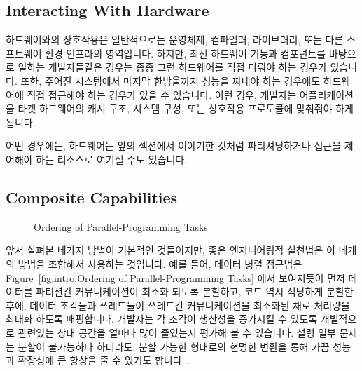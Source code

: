 \subsection{Interacting With Hardware}
\label{sec:Interacting With Hardware}

하드웨어와의 상호작용은 일반적으로는 운영체제, 컴파일러, 라이브러리, 또는 다른
소프트웨어 환경 인프라의 영역입니다.
하지만, 최신 하드웨어 기능과 컴포넌트를 바탕으로 일하는 개발자들같은 경우는
종종 그런 하드웨어를 직접 다뤄야 하는 경우가 있습니다.
또한, 주어진 시스템에서 마지막 한방울까지 성능을 짜내야 하는 경우에도
하드웨어에 직접 접근해야 하는 경우가 있을 수 있습니다.
이런 경우, 개발자는 어플리케이션을 타겟 하드웨어의 캐시 구조, 시스템 구성, 또는
상호작용 프로토콜에 맞춰줘야 하게 됩니다.

어떤 경우에는, 하드웨어는 앞의 섹션에서 이야기한 것처럼 파티셔닝하거나 접근을
제어해야 하는 리소스로 여겨질 수도 있습니다.

\subsection{Composite Capabilities}
\label{sec:Composite Capabilities}

\begin{figure}[tb]
\centering
{}
\caption{Ordering of Parallel-Programming Tasks}
\label{fig:intro:Ordering of Parallel-Programming Tasks}
\end{figure}

앞서 살펴본 네가지 방법이 기본적인 것들이지만, 좋은 엔지니어링적 실천법은 이
네개의 방법을 조합해서 사용하는 것입니다.
예를 들어, 데이터 병렬 접근법은 Figure~\ref{fig:intro:Ordering of
Parallel-Programming Tasks} 에서 보여지듯이 먼저 데이터를 파티션간
커뮤니케이션이 최소화 되도록 분할하고, 코드 역시 적당하게 분할한 후에, 데이터
조각들과 쓰레드들이 쓰레드간 커뮤니케이션을 최소화된 채로 처리량을 최대화
하도록 매핑합니다.
개발자는 각 조각이 생산성을 증가시킬 수 있도록 개별적으로 관련있는 상태 공간을
얼마나 많이 줄였는지 평가해 볼 수 있습니다.
설령 일부 문제는 분할이 불가능하다 하더라도, 분할 가능한 형태로의 현명한 변환을
통해 가끔 성능과 확장성에 큰 향상을 줄 수 있기도
합니다~\cite{PanagiotisMetaxas1999PDCS}.

